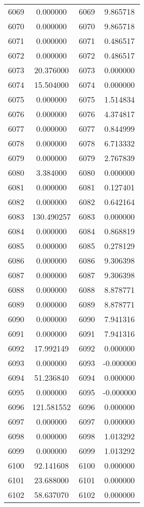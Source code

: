 \documentclass[12pt]{article}
\begin{document}
\begin{longtable}{@{}cccc@{}}
6069 & 0.000000 & 6069 & 9.865718 \\
6070 & 0.000000 & 6070 & 9.865718 \\
6071 & 0.000000 & 6071 & 0.486517 \\
6072 & 0.000000 & 6072 & 0.486517 \\
6073 & 20.376000 & 6073 & 0.000000 \\
6074 & 15.504000 & 6074 & 0.000000 \\
6075 & 0.000000 & 6075 & 1.514834 \\
6076 & 0.000000 & 6076 & 4.374817 \\
6077 & 0.000000 & 6077 & 0.844999 \\
6078 & 0.000000 & 6078 & 6.713332 \\
6079 & 0.000000 & 6079 & 2.767839 \\
6080 & 3.384000 & 6080 & 0.000000 \\
6081 & 0.000000 & 6081 & 0.127401 \\
6082 & 0.000000 & 6082 & 0.642164 \\
6083 & 130.490257 & 6083 & 0.000000 \\
6084 & 0.000000 & 6084 & 0.868819 \\
6085 & 0.000000 & 6085 & 0.278129 \\
6086 & 0.000000 & 6086 & 9.306398 \\
6087 & 0.000000 & 6087 & 9.306398 \\
6088 & 0.000000 & 6088 & 8.878771 \\
6089 & 0.000000 & 6089 & 8.878771 \\
6090 & 0.000000 & 6090 & 7.941316 \\
6091 & 0.000000 & 6091 & 7.941316 \\
6092 & 17.992149 & 6092 & 0.000000 \\
6093 & 0.000000 & 6093 & -0.000000 \\
6094 & 51.236840 & 6094 & 0.000000 \\
6095 & 0.000000 & 6095 & -0.000000 \\
6096 & 121.581552 & 6096 & 0.000000 \\
6097 & 0.000000 & 6097 & 0.000000 \\
6098 & 0.000000 & 6098 & 1.013292 \\
6099 & 0.000000 & 6099 & 1.013292 \\
6100 & 92.141608 & 6100 & 0.000000 \\
6101 & 23.688000 & 6101 & 0.000000 \\
6102 & 58.637070 & 6102 & 0.000000 \\

\end{longtable}
\end{document}
